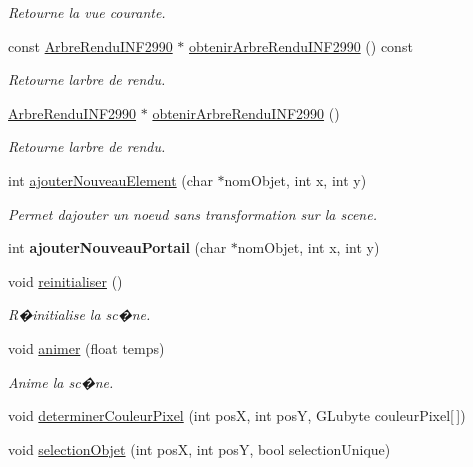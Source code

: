 \begin{DoxyCompactItemize}
\begin{DoxyCompactList}\small\item\em Retourne la vue courante. \end{DoxyCompactList}\item 
const \hyperlink{class_arbre_rendu_i_n_f2990}{Arbre\+Rendu\+I\+N\+F2990} $\ast$ \hyperlink{group__inf2990_ga381a8c1927abe900473fe663a0a9132d}{obtenir\+Arbre\+Rendu\+I\+N\+F2990} () const
\begin{DoxyCompactList}\small\item\em Retourne l\textquotesingle{}arbre de rendu. \end{DoxyCompactList}\item 
\hyperlink{class_arbre_rendu_i_n_f2990}{Arbre\+Rendu\+I\+N\+F2990} $\ast$ \hyperlink{group__inf2990_ga12d5594db6a9507b24c7e1ffcd6751af}{obtenir\+Arbre\+Rendu\+I\+N\+F2990} ()
\begin{DoxyCompactList}\small\item\em Retourne l\textquotesingle{}arbre de rendu. \end{DoxyCompactList}\item 
int \hyperlink{group__inf2990_ga9748abad7e15bbdd3e4f75910bd0ea0e}{ajouter\+Nouveau\+Element} (char $\ast$nom\+Objet, int x, int y)
\begin{DoxyCompactList}\small\item\em Permet d\textquotesingle{}ajouter un noeud sans transformation sur la scene. \end{DoxyCompactList}\item 
int {\bfseries ajouter\+Nouveau\+Portail} (char $\ast$nom\+Objet, int x, int y)
\item 
void \hyperlink{group__inf2990_ga4c2a991fe2297e44eeee0de111fb08d2}{reinitialiser} ()
\begin{DoxyCompactList}\small\item\em R�initialise la sc�ne. \end{DoxyCompactList}\item 
void \hyperlink{group__inf2990_ga24dcb4e32cf104797158b398bafbfbb7}{animer} (float temps)
\begin{DoxyCompactList}\small\item\em Anime la sc�ne. \end{DoxyCompactList}\item 
void \hyperlink{group__inf2990_ga85f2afcb297fbcaeb3cb96402e440671}{determiner\+Couleur\+Pixel} (int posX, int posY, G\+Lubyte couleur\+Pixel\mbox{[}$\,$\mbox{]})
\item 
void \hyperlink{group__inf2990_ga2b89ce775f045c41e61081d6271eaf1e}{selection\+Objet} (int posX, int posY, bool selection\+Unique)

\end{DoxyCompactItemize}
